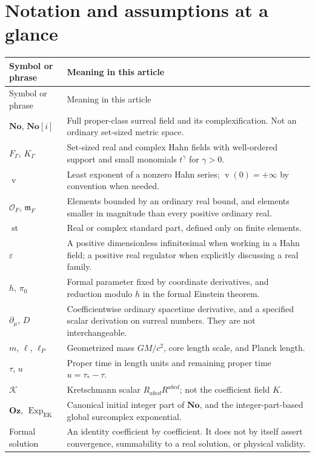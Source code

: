 \documentclass[11pt,a4paper]{article}
\numberwithin{equation}{section}
\theoremstyle{definition}
\theoremstyle{remark}
\newcommand{\No}{\mathbf{No}}
\newcommand{\OO}{\mathcal O}
\newcommand{\mm}{\mathfrak m}
\newcommand{\st}{\operatorname{st}}
\newcommand{\val}{\operatorname{v}}
\newcommand{\Oz}{\mathbf{Oz}}
\newcommand{\Kret}{\mathcal K}
\newcommand{\ExpEK}{\operatorname{Exp}_{\mathrm{EK}}}
\begin{document}
\section{Notation and assumptions at a glance}\label{app:notation}
\begin{longtable}{@{}>{\raggedright\arraybackslash}p{}
 >{\raggedright\arraybackslash}p{}@{}}
\toprule
Symbol or phrase & Meaning in this article\\
\midrule
\endfirsthead
\toprule Symbol or phrase & Meaning in this article\\\midrule
\endhead
\bottomrule
\endfoot
$\No$, $\No[i]$ & Full proper-class surreal field and its complexification.
Not an ordinary set-sized metric space.\\[4pt]
$F_\Gamma$, $K_\Gamma$ & Set-sized real and complex Hahn fields with well-ordered
support and small monomials $t^\gamma$ for $\gamma>0$.\\[4pt]
$\val$ & Least exponent of a nonzero Hahn series; $\val(0)=+\infty$ by
convention when needed.\\[4pt]
$\OO_F$, $\mm_F$ & Elements bounded by an ordinary real bound, and elements
smaller in magnitude than every positive ordinary real.\\[4pt]
$\st$ & Real or complex standard part, defined only on finite elements.\\[4pt]
$\varepsilon$ & A positive dimensionless infinitesimal when working in a Hahn
field; a positive real regulator when explicitly discussing a real family.\\[4pt]
$h$, $\pi_0$ & Formal parameter fixed by coordinate derivatives, and reduction
modulo $h$ in the formal Einstein theorem.\\[4pt]
$\partial_\mu$, $D$ & Coefficientwise ordinary spacetime derivative, and a
specified scalar derivation on surreal numbers. They are not interchangeable.\\[4pt]
$m$, $\ell$, $\ell_P$ & Geometrized mass $GM/c^2$, core length scale, and
Planck length.\\[4pt]
$\tau$, $u$ & Proper time in length units and remaining proper time
$u=\tau_*-\tau$.\\[4pt]
$\Kret$ & Kretschmann scalar $R_{abcd}R^{abcd}$; not the coefficient field $K$.\\[4pt]
$\Oz$, $\ExpEK$ & Canonical initial integer part of $\No$, and the
integer-part-based global surcomplex exponential.\\[4pt]
Formal solution & An identity coefficient by coefficient. It does not by itself
assert convergence, summability to a real solution, or physical validity.\\
\end{longtable}
\end{document}
